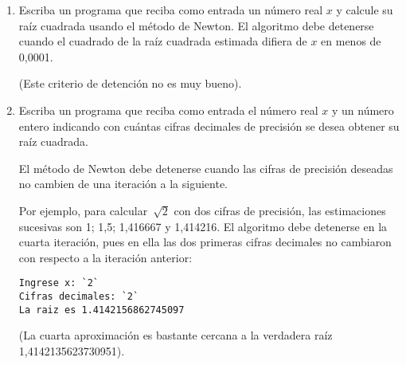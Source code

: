 \begin{enumerate}
\item
  Escriba un programa que reciba como entrada un número real \(x\) y
  calcule su raíz cuadrada usando el método de Newton. El algoritmo debe
  detenerse cuando el cuadrado de la raíz cuadrada estimada difiera de
  \(x\) en menos de 0,0001.

  (Este criterio de detención no es muy bueno).
\item
  Escriba un programa que reciba como entrada el número real \(x\) y un
  número entero indicando con cuántas cifras decimales de precisión se
  desea obtener su raíz cuadrada.

  El método de Newton debe detenerse cuando las cifras de precisión
  deseadas no cambien de una iteración a la siguiente.

  Por ejemplo, para calcular~\(\sqrt{2}\) con dos cifras de precisión,
  las estimaciones sucesivas son 1; 1,5; 1,416667 y 1,414216.
  El algoritmo debe detenerse en la cuarta iteración, pues en
  ella las dos primeras cifras decimales no cambiaron con respecto a la
  iteración anterior:

\begin{lstlisting}[language=testcase]
Ingrese x: `2`
Cifras decimales: `2`
La raiz es 1.4142156862745097
\end{lstlisting}

  (La cuarta aproximación es bastante cercana a la verdadera raíz
  1,4142135623730951).
\end{enumerate}
